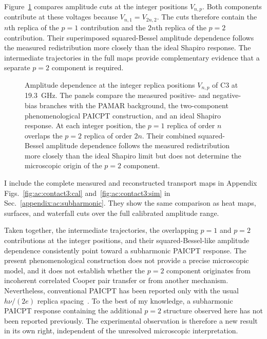         Figure~\ref{fig:ac:contact3:amplitude-cuts} compares amplitude cuts at the integer positions $V_{n,p}$. Both components contribute at these voltages because $V_{n,1}=V_{2n,2}$. The cuts therefore contain the $n$th replica of the $p=1$ contribution and the $2n$th replica of the $p=2$ contribution. Their superimposed squared-Bessel amplitude dependence follows the measured redistribution more closely than the ideal Shapiro response. The intermediate trajectories in the full maps provide complementary evidence that a separate $p=2$ component is required.

        \begin{figure}[t]
            \centering
            \par
            \caption{
                Amplitude dependence at the integer replica positions $V_{n,p}$ of C3 at \qty{19.3}{\giga\hertz}. The panels compare the measured positive- and negative-bias branches with the PAMAR background, the two-component phenomenological PAICPT construction, and an ideal Shapiro response. At each integer position, the $p=1$ replica of order $n$ overlaps the $p=2$ replica of order $2n$. Their combined squared-Bessel amplitude dependence follows the measured redistribution more closely than the ideal Shapiro limit but does not determine the microscopic origin of the $p=2$ component.
            }
            \label{fig:ac:contact3:amplitude-cuts}
        \end{figure}

        I include the complete measured and reconstructed transport maps in Appendix Figs.~\ref{fig:ac:contact3:cal} and~\ref{fig:ac:contact3:sim} in Sec.~\ref{appendix:ac:subharmonic}. They show the same comparison as heat maps, surfaces, and waterfall cuts over the full calibrated amplitude range.

        Taken together, the intermediate trajectories, the overlapping $p=1$ and $p=2$ contributions at the integer positions, and their squared-Bessel-like amplitude dependence consistently point toward a subharmonic PAICPT response. The present phenomenological construction does not provide a precise microscopic model, and it does not establish whether the $p=2$ component originates from incoherent correlated Cooper pair transfer or from another mechanism. Nevertheless, conventional PAICPT has been reported only with the usual $h\nu/(2e)$ replica spacing~\cite{roychowdhury_microwave_2015}. To the best of my knowledge, a subharmonic PAICPT response containing the additional $p=2$ structure observed here has not been reported previously. The experimental observation is therefore a new result in its own right, independent of the unresolved microscopic interpretation.
